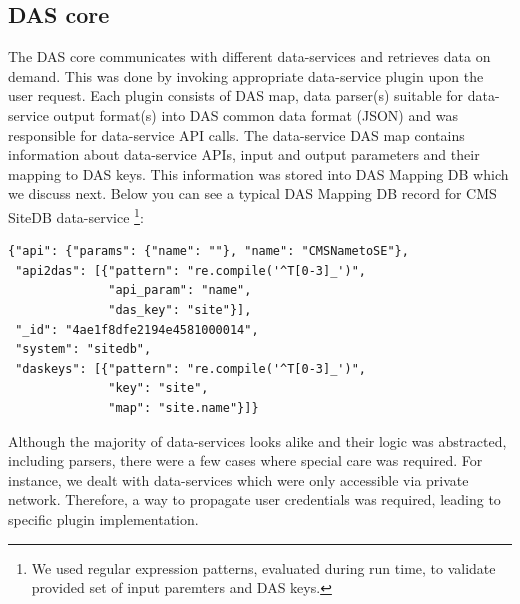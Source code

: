 \documentclass[a4paper]{jpconf}
\begin{document}
\subsection{DAS core}
The DAS core communicates with different data-services and retrieves
data on demand. This was done by invoking appropriate data-service plugin
upon the user request. Each plugin consists of DAS map,
data parser(s) suitable for data-service output format(s) into DAS common
data format (JSON) and was responsible for data-service API calls.
The data-service DAS map contains information about data-service APIs,
input and output parameters and their mapping to DAS keys. 
This information was stored into DAS Mapping DB which we discuss next.
Below you can see a typical DAS Mapping DB record for CMS
SiteDB data-service \cite{SiteDB}\footnote{We used regular expression 
patterns, evaluated during run time, to validate provided set of input 
paremters and DAS keys.}:
\begin{verbatim}
{"api": {"params": {"name": ""}, "name": "CMSNametoSE"}, 
 "api2das": [{"pattern": "re.compile('^T[0-3]_')", 
              "api_param": "name", 
              "das_key": "site"}], 
 "_id": "4ae1f8dfe2194e4581000014", 
 "system": "sitedb", 
 "daskeys": [{"pattern": "re.compile('^T[0-3]_')", 
              "key": "site", 
              "map": "site.name"}]}
\end{verbatim}
Although the majority of data-services looks alike
and their logic was abstracted, including parsers, there were a few
cases where special care was required. For instance,
we dealt with data-services which were only accessible via private network.
Therefore, a way to propagate user credentials was required, leading
to specific plugin implementation.

\end{document}
